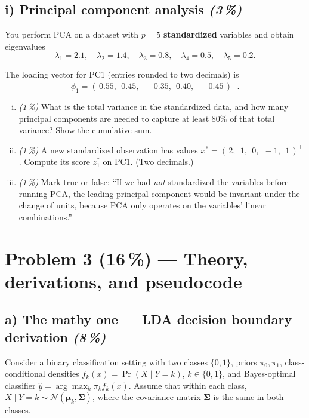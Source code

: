 \documentclass[11pt,a4paper]{article}
\newcommand{\points}[1]{\textbf{(#1\,\%)}}
\newcommand{\subpoints}[1]{\textit{(#1\,\%)}}
\begin{document}
\subsection*{i) Principal component analysis \subpoints{3}}

You perform PCA on a dataset with $p = 5$ \textbf{standardized} variables and obtain eigenvalues
$$\lambda_1 = 2.1, \quad \lambda_2 = 1.4, \quad \lambda_3 = 0.8, \quad \lambda_4 = 0.5, \quad \lambda_5 = 0.2.$$

The loading vector for PC1 (entries rounded to two decimals) is
$$\phi_1 = (\,0.55,\;\, 0.45,\;\, -0.35,\;\, 0.40,\;\, -0.45\,)^\top.$$

\begin{enumerate}[(i)]
  \item \subpoints{1} What is the total variance in the standardized data, and how many principal components are needed to capture at least $80\%$ of that total variance? Show the cumulative sum.
  \item \subpoints{1} A new standardized observation has values $x^* = (\,2,\;\, 1,\;\, 0,\;\, -1,\;\, 1\,)^\top$. Compute its score $z^*_1$ on PC1. (Two decimals.)
  \item \subpoints{1} Mark true or false: ``If we had \emph{not} standardized the variables before running PCA, the leading principal component would be invariant under the change of units, because PCA only operates on the variables' linear combinations.''
\end{enumerate}

\vfill\eject

\section*{Problem 3 \points{16} --- Theory, derivations, and pseudocode}

\subsection*{a) The mathy one --- LDA decision boundary derivation \subpoints{8}}

Consider a binary classification setting with two classes $\{0, 1\}$, priors $\pi_0, \pi_1$, class-conditional densities $f_k(x) = \Pr(X \mid Y = k)$, $k \in \{0, 1\}$, and Bayes-optimal classifier $\hat y = \arg\max_k \pi_k f_k(x)$. Assume that within each class, $X \mid Y = k \sim \mathcal{N}(\boldsymbol\mu_k, \boldsymbol\Sigma)$, where the covariance matrix $\boldsymbol\Sigma$ is the same in both classes.
\end{document}
